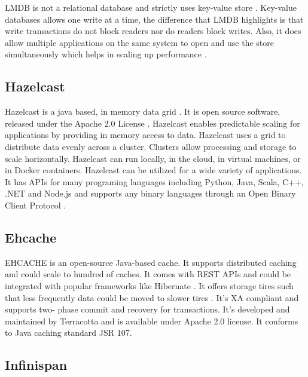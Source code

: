      LMDB is not a relational database and
     strictly uses key-value store \cite{www-relationaldb}.
     Key-value databases allows one
     write at a time, the difference that LMDB highlights is that
     write transactions do not block readers nor do readers block
     writes. Also, it does allow multiple applications on the same
     system to open and use the store simultaneously which helps in
     scaling up performance \cite{www-lmdb}.

     \pv

\subsection{Hazelcast}

     Hazelcast is a java based, in memory data grid
     \cite{www-wikihazel}.  It is open source software, released
     under the Apache 2.0 License \cite{www-githubhazel}. Hazelcast
     enables predictable scaling for applications by providing in
     memory access to data.  Hazelcast uses a grid to distribute data
     evenly across a cluster. Clusters allow processing and storage to
     scale horizontally. Hazelcast can run locally, in the cloud, in
     virtual machines, or in Docker containers. Hazelcast can be
     utilized for a wide variety of applications. It has APIs for many
     programing languages including Python, Java, Scala, C++, .NET and
     Node.js and supports any binary languages through an Open Binary
     Client Protocol \cite{www-wikihazel}.

\subsection{Ehcache}

     EHCACHE is an open-source Java-based cache. It supports
     distributed caching and could scale to hundred of caches. It
     comes with REST APIs and could be integrated with popular
     frameworks like Hibernate \cite{www-ehcache-features}. It offers
     storage tires such that less frequently data could be moved to
     slower tires \cite{www-ehcache-documentation}. It's XA compliant
     and supports two- phase commit and recovery for
     transactions. It's developed and maintained by Terracotta and is
     available under Apache 2.0 license.  It conforms to Java caching
     standard JSR 107.

\subsection{Infinispan}

